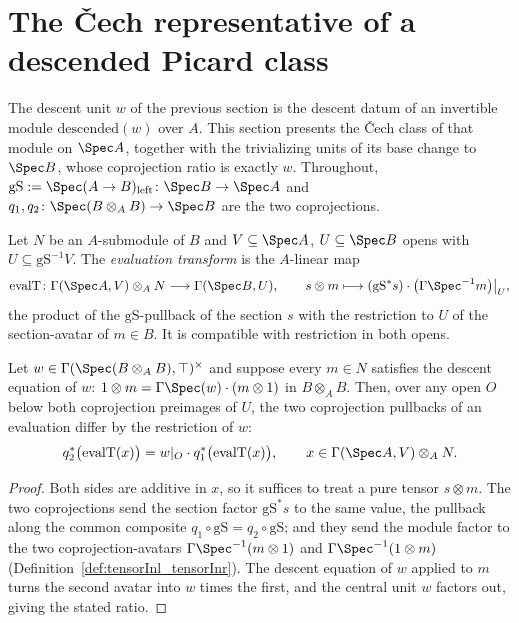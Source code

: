 \section{The \v Cech representative of a descended Picard class}
\label{sec:descentClassRep}

The descent unit \(w\) of the previous section is the descent datum of an invertible module
\(\mathrm{descended}(w)\) over \(A\).  This section presents the \v Cech class of that module on
\(\Spec A\), together with the trivializing units of its base change to \(\Spec B\), whose
coprojection ratio is exactly \(w\).  Throughout, \(\mathrm{gS} := \Spec(A \to B)_{\mathrm{left}}
\colon \Spec B \to \Spec A\) and \(q_1, q_2 \colon \Spec(B \otimes_A B) \to \Spec B\) are the two
coprojections.

\begin{definition}
  \label{def:evalT}
  \leanok
  Let \(N\) be an \(A\)-submodule of \(B\) and \(V \subseteq \Spec A\), \(U \subseteq \Spec B\)
  opens with \(U \subseteq \mathrm{gS}^{-1}V\).  The \emph{evaluation transform} is the
  \(A\)-linear map
  \[
    \mathrm{evalT} \colon \Gamma(\Spec A, V) \otimes_A N \longrightarrow \Gamma(\Spec B, U),
    \qquad s \otimes m \longmapsto (\mathrm{gS}^{*} s) \cdot \bigl(\Gamma\Spec^{-1} m\bigr)
    \big|_{U},
  \]
  the product of the \(\mathrm{gS}\)-pullback of the section \(s\) with the restriction to
  \(U\) of the section-avatar of \(m \in B\).  It is compatible with restriction in both opens.
\end{definition}

\begin{lemma}
  \label{lem:evalT_ratio}
  \leanok
  Let \(w \in \Gamma(\Spec(B \otimes_A B), \top)^{\times}\) and suppose every \(m \in N\)
  satisfies the descent equation of \(w\): \(1 \otimes m = \Gamma\Spec(w) \cdot (m \otimes 1)\)
  in \(B \otimes_A B\).  Then, over any open \(O\) below both coprojection preimages of \(U\),
  the two coprojection pullbacks of an evaluation differ by the restriction of \(w\):
  \[
    q_2^{*}\bigl(\mathrm{evalT}(x)\bigr) = w|_{O} \cdot q_1^{*}\bigl(\mathrm{evalT}(x)\bigr),
    \qquad x \in \Gamma(\Spec A, V) \otimes_A N.
  \]
\end{lemma}
\begin{proof}
  \leanok
  Both sides are additive in \(x\), so it suffices to treat a pure tensor \(s \otimes m\).  The
  two coprojections send the section factor \(\mathrm{gS}^{*} s\) to the same value, the
  pullback along the common composite \(q_1 \circ \mathrm{gS} = q_2 \circ \mathrm{gS}\); and
  they send the module factor to the two coprojection-avatars \(\Gamma\Spec^{-1}(m \otimes 1)\)
  and \(\Gamma\Spec^{-1}(1 \otimes m)\) (Definition~\ref{def:tensorInl_tensorInr}).  The descent
  equation of \(w\) applied to \(m\) turns the second avatar into \(w\) times the first, and the
  central unit \(w\) factors out, giving the stated ratio.
\end{proof}

